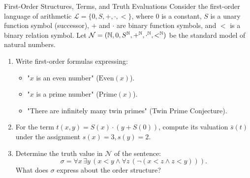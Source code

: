 \begin{exercise}{First-Order Structures, Terms, and Truth Evaluations}
Consider the first-order language of arithmetic $\mathcal{L} = \{0, S, +, \cdot, <\}$, where $0$ is a constant, $S$ is a unary function symbol (successor), $+$ and $\cdot$ are binary function symbols, and $<$ is a binary relation symbol.
Let $\mathcal{N} = (\mathbb{N}, 0, S^{\mathbb{N}}, +^{\mathbb{N}}, \cdot^{\mathbb{N}}, <^{\mathbb{N}})$ be the standard model of natural numbers.
\begin{enumerate}[leftmargin=1.5em,itemsep=2pt]
  \item Write first-order formulas expressing:
  \begin{itemize}[leftmargin=1.2em,itemsep=1pt]
    \item "$x$ is an even number" ($\mathrm{Even}(x)$).
    \item "$x$ is a prime number" ($\mathrm{Prime}(x)$).
    \item "There are infinitely many twin primes" (Twin Prime Conjecture).
  \end{itemize}
  \item For the term $t(x, y) = S(x) \cdot (y + S(0))$, compute its valuation $\bar{s}(t)$ under the assignment $s(x) = 3, s(y) = 2$.
  \item Determine the truth value in $\mathcal{N}$ of the sentence:
  \[
  \sigma = \forall x\, \exists y\, (x < y \land \forall z\, (\neg(x < z \land z < y))).
  \]
  What does $\sigma$ express about the order structure?
\end{enumerate}
\end{exercise}

\begin{tabletworkspace}[5.0cm]
\end{tabletworkspace}

